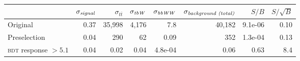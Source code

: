 \begin{tabular}{lrrrrrrr}
\toprule
{} &  $\sigma_\text{\emph{signal}}$ &  $\sigma_{t\overline{t}}$ &  $\sigma_\text{\emph{tbW}}$
   &  $\sigma_\text{\emph{bbWW}}$ &  $\sigma_\text{\emph{background (total)}}$ &   $S/B$ &  $S/\sqrt{B}$ \\
\midrule
Original           &               0.37 &          35,998 &           4,176 &              7.8 &             40,182 & 9.1e-06 &          0.10 \\
Preselection &               0.04 &             290 &              62 &             0.09 &                352 & 1.3e-04 &          0.13 \\
\textsc{bdt} response $> 5.1$      &               0.04 &            0.02 &            0.04 &          4.8e-04 &               0.06 &    0.63 &           8.4 \\
\bottomrule
\end{tabular}
